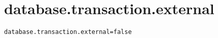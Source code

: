 \section{database.transaction.external}
\label{configuration:DatabaseTransactionExternal}
\ClearAPI
\TODO
{}
\begin{lstlisting}[style=Props,caption={Usage example for \textit{database.transaction.external}}]
database.transaction.external=false
\end{lstlisting}